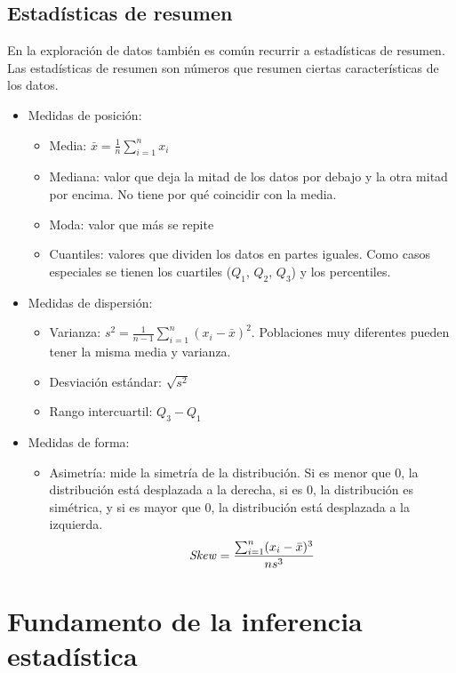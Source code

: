 \subsection{Estadísticas de resumen}

En la exploración de datos también es común recurrir a estadísticas de resumen. Las estadísticas de resumen son números que resumen ciertas características de los datos. 
\begin{itemize}
\item Medidas de posición: 
\begin{itemize}
\item Media: $\bar{x} = \frac{1}{n} \sum_{i=1}^{n} x_i$
\item Mediana: valor que deja la mitad de los datos por debajo y la otra mitad por encima. No tiene por qué coincidir con la media.
\item Moda: valor que más se repite
\item Cuantiles: valores que dividen los datos en partes iguales. Como casos especiales se tienen los cuartiles ($Q_1$, $Q_2$, $Q_3$) y los percentiles.
\end{itemize}
\item Medidas de dispersión: 
\begin{itemize}
\item Varianza: $s^2 = \frac{1}{n-1} \sum_{i=1}^{n} (x_i - \bar{x})^2$. Poblaciones muy diferentes pueden tener la misma media y varianza.
\item Desviación estándar: $\sqrt{s^2}$
\item Rango intercuartil: $Q_3 - Q_1$
\end{itemize}
\item Medidas de forma: 
\begin{itemize}
\item Asimetría: mide la simetría de la distribución. Si es menor que 0, la distribución está desplazada a la derecha, si es 0, la distribución es simétrica, y si es mayor que 0, la distribución está desplazada a la izquierda.
\begin{equation}
\text{\textit{Skew}} = \frac{\sum_{i=1}^{n} (x_i - \bar{x})^3}{n s^3}
\end{equation}
\end{itemize}
\end{itemize}


\section{Fundamento de la inferencia estadística}

